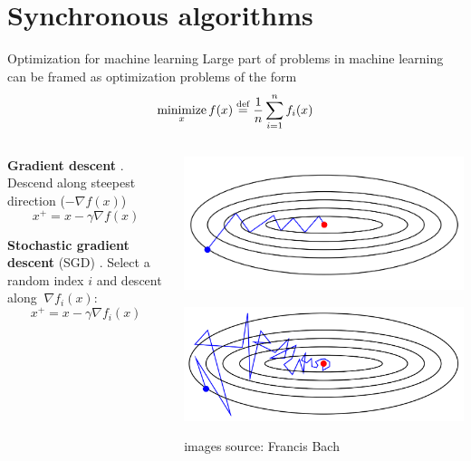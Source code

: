 \documentclass[10pt]{beamer}
\let\oldparencite=\parencite
\renewcommand{\parencite}[1]{\textcolor[rgb]{.7,.7,.7}{\oldparencite{#1}}}
\begin{document}
\section{Synchronous algorithms}

\begin{frame}{Optimization for machine learning}
Large part of problems in machine learning can be framed as optimization problems of the form
$$\operatorname*{minimize}_x f(x) \stackrel{\text{def}}{=} \displaystyle\frac{1}{n}\sum^{n}_{i=1} f_i(x)$$
\begin{columns}
\begin{column}{0.6\textwidth}  %
{\bfseries Gradient descent} \parencite{cauchy1847methode}. Descend along steepest direction ($-\nabla f(x)$)
$$x^+ = x - \gamma \nabla f(x)$$

{\bfseries Stochastic gradient descent} (SGD) \parencite{robbins1951sgd}. Select a random index $i$ and descent along $~\nabla f_i(x)$:
$$x^+ = x - \gamma \nabla f_i(x)$$

\end{column}
\begin{column}{0.4\textwidth}  %
\includegraphics[width=\linewidth]{img/gd}

\vspace{2em}
\includegraphics[width=\linewidth]{img/sgd}
\vspace*{-2.5em}\begin{flushright}{\footnotesize images source: Francis Bach}\end{flushright}
\end{column}
\end{columns}
\end{frame}
\end{document}
